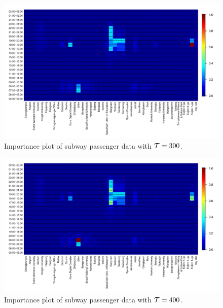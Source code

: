 \documentclass[preprint, review, 12pt]{article}
\theoremstyle{definition}
\theoremstyle{remark}
\begin{document}
\begin{figure}
	\centering
	\includegraphics[width=1.05\textwidth]{Fig/In_scale_4.pdf}
	\vspace{-13mm}
	\caption{Importance plot of subway passenger data with ${\cal T}=300$.}
	\label{snow:subway_in_3}
\end{figure}

\begin{figure}
	\centering
	\includegraphics[width=1.05\textwidth]{Fig/In_scale_5.pdf}
	\vspace{-13mm}
	\caption{Importance plot of subway passenger data with ${\cal T}=400$.}
	\label{snow:subway_in_4}
\end{figure}	
\end{document}
